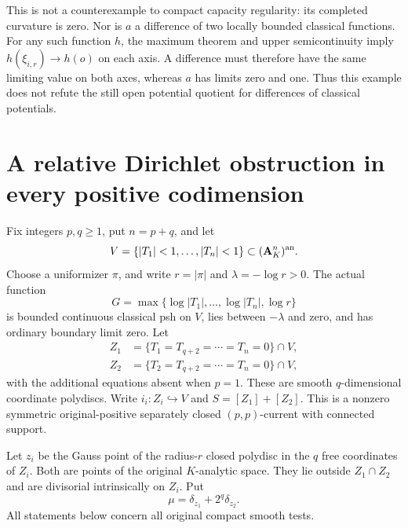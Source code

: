 \documentclass[11pt,a4paper]{article}
\numberwithin{equation}{section}
\theoremstyle{definition}
\theoremstyle{remark}
\begin{document}
This is not a counterexample to compact capacity regularity: its
completed curvature is zero. Nor is $a$ a difference of two locally
bounded classical functions. For any such function $h$, the maximum
theorem and upper semicontinuity imply
$h(\xi_{i,r})\to h(o)$ on each axis. A difference must therefore
have the same limiting value on both axes, whereas $a$ has limits
zero and one. Thus this example does not refute the still open
potential quotient for differences of classical potentials.



\section{A relative Dirichlet obstruction in every positive codimension}
\label{sec:r3-arbitrary-relative-dirichlet-obstruction}

Fix integers $p,q\geq1$, put $n=p+q$, and let
\[
 V=\{|T_1|<1,\ldots,|T_n|<1\}\subset(\mathbf A_K^n)^{\rm an}.
\]
Choose a uniformizer $\pi$, and write $r=|\pi|$ and
$\lambda=-\log r>0$. The actual function
\[
 G=\max\{\log|T_1|,\ldots,\log|T_n|,\log r\}
\]
is bounded continuous classical psh on $V$, lies between
$-\lambda$ and zero, and has ordinary boundary limit zero.
Let
\[
 \begin{split}
 Z_1&=\{T_1=T_{q+2}=\cdots=T_n=0\}\cap V,\\
 Z_2&=\{T_2=T_{q+2}=\cdots=T_n=0\}\cap V ,
 \end{split}
\]
with the additional equations absent when $p=1$. These are smooth
$q$-dimensional coordinate polydiscs. Write $i_i:Z_i\hookrightarrow V$
and $S=[Z_1]+[Z_2]$. This is a nonzero symmetric original-positive
separately closed $(p,p)$-current with connected support.

Let $z_i$ be the Gauss point of the radius-$r$ closed polydisc in
the $q$ free coordinates of $Z_i$. Both are points of the original
$K$-analytic space. They lie outside $Z_1\cap Z_2$ and are
divisorial intrinsically on $Z_i$. Put
\[
 \mu=\delta_{z_1}+2^q\delta_{z_2}.
\]
All statements below concern all original compact smooth tests.
\end{document}
